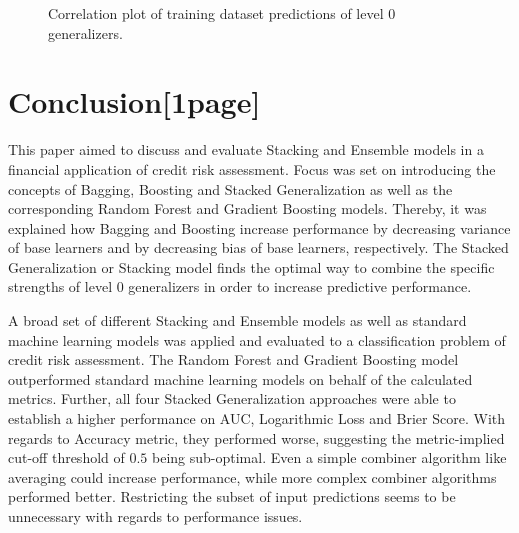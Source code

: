 \documentclass[12pt]{article}
\begin{document}
\begin{figure}[htp] 
\caption{Correlation plot of training dataset predictions of level 0 generalizers.}\label{corrgram}
\end{figure}  



\section{Conclusion[1page]}
This paper aimed to discuss and evaluate Stacking and Ensemble models in a financial application of credit risk assessment. Focus was set on introducing the concepts of Bagging, Boosting and Stacked Generalization as well as the corresponding Random Forest and Gradient Boosting models. Thereby, it was explained how Bagging and Boosting increase performance by decreasing variance of base learners and by decreasing bias of base learners, respectively. The Stacked Generalization or Stacking model finds the optimal way to combine the specific strengths of level 0 generalizers in order to increase predictive performance.

A broad set of different Stacking and Ensemble models as well as standard machine learning models was applied and evaluated to a classification problem of credit risk assessment. The Random Forest and Gradient Boosting model outperformed standard machine learning models on behalf of the calculated metrics. Further, all four Stacked Generalization approaches were able to establish a higher performance on AUC, Logarithmic Loss and Brier Score. With regards to Accuracy metric, they performed worse, suggesting the metric-implied cut-off threshold of $0.5$ being sub-optimal. Even a simple combiner algorithm like averaging could increase performance, while more complex combiner algorithms performed better. Restricting the subset of input predictions seems to be unnecessary with regards to performance issues.
\end{document}

